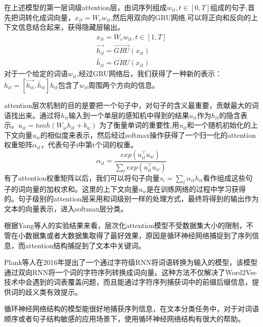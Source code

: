 \documentclass[UTF8]{ctexart}
\begin{document}
	在上述模型的第一层词级attention层，由词序列组成$w_{it} ,t\in [0,T]$组成的句子,首先把词转化成词向量，$x_{it}=W_{e}w_{it}$,然后用双向的GRU网络,可以将正向和反向的上下文信息结合起来，获得隐藏层输出。
	\begin{align*}
		x_{it}=W_{e}w_{it},t\in[1,T]\\ 
		\overrightarrow{h_{it}}=\overrightarrow{GRU}({x_{it}})\\
		\overleftarrow{h_{it}}=\overleftarrow{GRU}({x_{it}})
	\end{align*}
	对于一个给定的词语$w_{it}$,经过GRU网络后，我们获得了一种新的表示：$h_{it}=[\overrightarrow{h_{it}},\overleftarrow{h_{it}}]$$h_{it}$包含了$w_{it}$周围两个方向的信息。
	\par attention层次机制的目的是要把一个句子中，对句子的含义最重要，贡献最大的词语找出来。通过将$h_{it}$输入到一个单层的感知机中得到的结果$u_{it}$作为$h_{it}$的隐含表示。$u_{it}=tanh(W_{w}h_{it}+b_{w})$
	为了衡量单词的重要性,用$u_{it}$和一个随机初始化的上下文向量$u_{w}$的相似度来表示，然后经过softmax操作获得了一个归一化的attention权重矩阵$\alpha _{it}$，代表句子i中第t个词的权重。
	\begin{displaymath}
		\alpha _{it}=\frac{exp\left( u_{it}^{\top } u_{w}\right) }{\sum_{t}^{}{exp\left( u_{it}^\top u_{w} \right) }}
	\end{displaymath}
	有了attention权重矩阵以后，我们可以将句子向量$s_{i}=\sum_{t}{\alpha_{it}h_{it}}$看作组成这些句子的词向量的加权求和。这里的上下文向量$u_{w}$是在训练网络的过程中学习获得的。句子级别的attention层采用和词级别一样的处理方式，最终将得到的输出作为文本的向量表示，进入softmax层分类。
	\par 根据Yang等人的实验结果来看，层次化attention模型不受数据集大小的限制，不管在小数据集或者大数据集取得了最好效果，原因是循环神经网络捕捉到了序列信息，而attention结构捕捉到了文本中关键词。
	\par Plank等人在2016年提出了一个通过字符级RNN将词语转换为输入的模型，该模型通过双向RNN将一个词的字符序列转换成词向量。这种方法不仅解决了Word2Vec技术中会遇到的词表覆盖问题，而且能通过字符序列捕获词中的前缀后缀信息，提供词的歧义类有效提示。
	\par 循环神经网络结构的模型能很好地捕获序列信息，在文本分类任务中，对于对词语顺序或者句子结构敏感的应用场景下，使用循环神经网络结构有很大的帮助。
	
\end{document}
